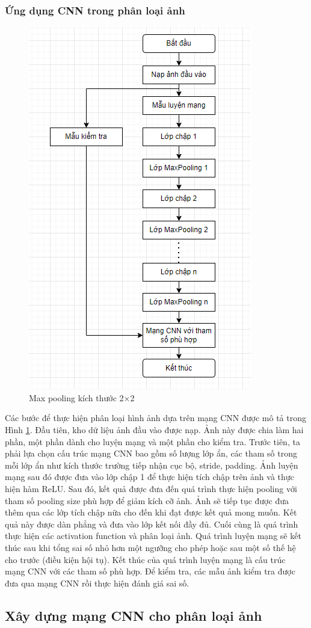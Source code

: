 \subsubsection{Ứng dụng CNN trong phân loại ảnh}
\begin{figure}[H]
	\centering
	\includegraphics[width=0.8\linewidth]{images/placnn.png}
	\caption{Max pooling kích thước 2×2}
	\label{fig:placnn}
\end{figure}
Các bước để thực hiện phân loại hình ảnh dựa trên mạng CNN được mô tả trong Hình \ref{fig:placnn}. Đầu tiên, kho dữ liệu ảnh đầu vào được nạp. Ảnh này được chia làm hai phần, một phần dành cho luyện mạng và một phần cho kiểm tra. Trước tiên, ta phải lựa chọn cấu trúc mạng CNN bao gồm số lượng lớp ẩn, các tham số trong mỗi lớp ẩn như kích thước trường tiếp nhận cục bộ, stride, padding.  Ảnh luyện mạng sau đó được đưa vào lớp chập 1 để thực hiện tích chập trên ảnh và thực hiện hàm ReLU. Sau đó, kết quả được đưa đến quá trình thực hiện pooling với tham số pooling size phù hợp để giảm kích cỡ ảnh. Ảnh sẽ tiếp tục được đưa thêm qua các lớp tích chập nữa cho đến khi đạt được kết quả mong muốn. Kết quả này được dàn phẳng và đưa vào lớp kết nối đầy đủ. Cuối cùng là quá trình thực hiện các activation function và phân loại ảnh. Quá trình luyện mạng sẽ kết thúc sau khi tổng sai số nhỏ hơn một ngưỡng cho phép hoặc sau một số thế hệ cho trước (điều kiện hội tụ). Kết thúc của quá trình luyện mạng là cấu trúc mạng CNN với các tham số phù hợp. Để kiểm tra, các mẫu ảnh kiểm tra được đưa qua mạng CNN rồi thực hiện đánh giá sai số.

\subsection{Xây dựng mạng CNN cho phân loại ảnh} 
